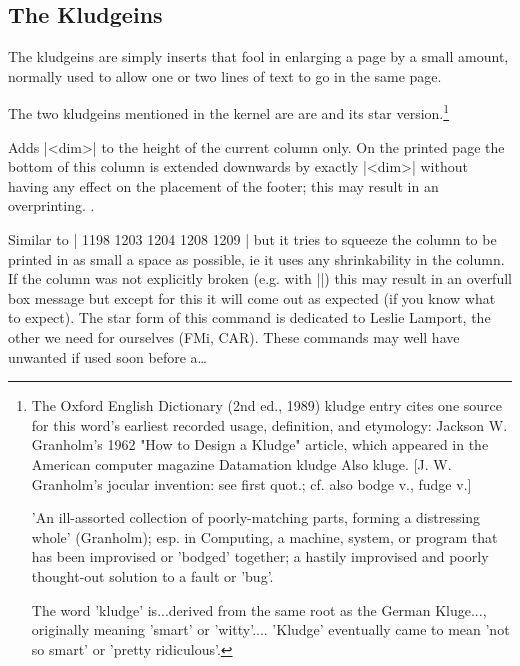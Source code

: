 \begin{teX}
\section*{The Kludgeins}

The kludgeins are simply inserts that fool \tex in enlarging a page by a small amount, normally used to allow one or two lines of text to go in the same page.

The two kludgeins mentioned in the kernel are are  and its star version.\footnote{The Oxford English Dictionary (2nd ed., 1989) kludge entry cites one source for this word's earliest recorded usage, definition, and etymology: Jackson W. Granholm's 1962 "How to Design a Kludge" article, which appeared in the American computer magazine Datamation
kludge  Also kluge. [J. W. Granholm's jocular invention: see first quot.; cf. also bodge v., fudge v.]

'An ill-assorted collection of poorly-matching parts, forming a distressing whole' (Granholm); esp. in Computing, a machine, system, or program that has been improvised or 'bodged' together; a hastily improvised and poorly thought-out solution to a fault or 'bug'.

The word 'kludge' is...derived from the same root as the German Kluge..., originally meaning 'smart' or 'witty'.... 'Kludge' eventually came to mean 'not so smart' or 'pretty ridiculous'.}



\begin{teXX}
\gdef \enlargethispage{%
1198 \@ifstar
1199 {%
1203   \@enlargepage{\hbox{\kern\p@}}}%
1204 {%
1208   \@enlargepage\@empty}%
1209 }
\end{teXX}

Adds |<dim>| to the height of the current column only. On the printed page the
bottom of this column is extended downwards by exactly |<dim>| without having
any effect on the placement of the footer; this may result in an overprinting.
.

Similar to |\enlargethispage| but it tries to squeeze the column to be printed
in as small a space as possible, ie it uses any shrinkability in the column. If the
column was not explicitly broken (e.g. with |\pagebreak|) this may result in an
overfull box message but except for this it will come out as expected (if you know
what to expect).
The star form of this command is dedicated to Leslie Lamport, the other we
need for ourselves (FMi, CAR).
These commands may well have unwanted if used soon before a\ldots


\end{teX}
